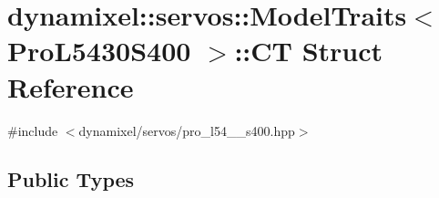 \hypertarget{structdynamixel_1_1servos_1_1_model_traits_3_01_pro_l5430_s400_01_4_1_1_c_t}{}\section{dynamixel\+:\+:servos\+:\+:Model\+Traits$<$ Pro\+L5430\+S400 $>$\+:\+:CT Struct Reference}
\label{structdynamixel_1_1servos_1_1_model_traits_3_01_pro_l5430_s400_01_4_1_1_c_t}


{\ttfamily \#include $<$dynamixel/servos/pro\+\_\+l54\+\_\+\_\+s400.\+hpp$>$}

\subsection*{Public Types}
